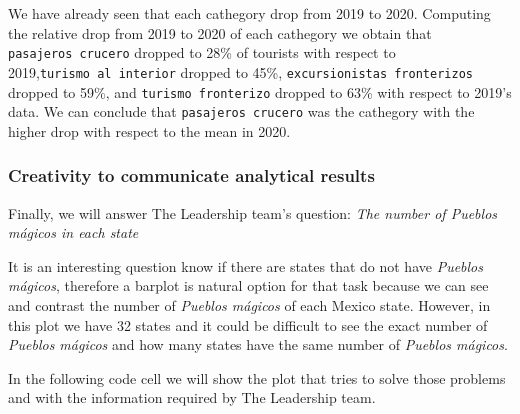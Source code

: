 \documentclass[11pt]{article}
\begin{document}
We have already seen that each cathegory drop from 2019 to 2020.
Computing the relative drop from 2019 to 2020 of each cathegory we
obtain that \texttt{pasajeros\ crucero} dropped to 28\% of tourists with
respect to 2019,\texttt{turismo\ al\ interior} dropped to 45\%,
\texttt{excursionistas\ fronterizos} dropped to 59\%, and
\texttt{turismo\ fronterizo} dropped to 63\% with respect to 2019's
data. We can conclude that \texttt{pasajeros\ crucero} was the cathegory
with the higher drop with respect to the mean in 2020.

    \hypertarget{creativity-to-communicate-analytical-results}{%
\subsubsection{Creativity to communicate analytical
results}\label{creativity-to-communicate-analytical-results}}

    Finally, we will answer The Leadership team's question: \emph{The number
of Pueblos mágicos in each state}

It is an interesting question know if there are states that do not have
\emph{Pueblos mágicos}, therefore a barplot is natural option for that
task because we can see and contrast the number of \emph{Pueblos
mágicos} of each Mexico state. However, in this plot we have 32 states
and it could be difficult to see the exact number of \emph{Pueblos
mágicos} and how many states have the same number of \emph{Pueblos
mágicos}.

In the following code cell we will show the plot that tries to solve
those problems and with the information required by The Leadership team.
\end{document}
